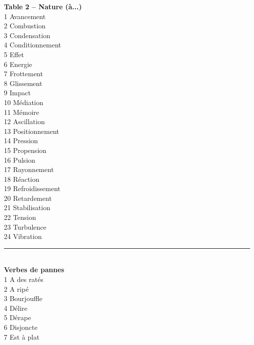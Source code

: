 \documentclass[11pt,twoside,a4paper]{article}
\begin{document}
\begin{table}[ht]
\begin{multicols}{5}
{\textbf{Table 2 -- Nature ({\`a}...)}~\\
1	Avancement~\\
2	Combustion~\\
3	Condensation~\\
4	Conditionnement~\\
5	Effet~\\
6	Energie~\\
7	Frottement~\\
8	Glissement~\\
9	Impact~\\
10	M{\'e}diation~\\
11	M{\'e}moire~\\
12	Ascillation~\\
13	Positionnement~\\
14	Pression~\\
15	Propension~\\
16	Pulsion~\\
17	Rayonnement~\\
18	R{\'e}action~\\
19	Refroidissement~\\
20	Retardement~\\
21	Stabilisation~\\
22	Tension~\\
23	Turbulence~\\
24	Vibration~\\

\rule{0.15\textwidth}{0.05cm}~\\

\textbf{Verbes de pannes}~\\
1	A des rat{\'e}s~\\
2	A rip{\'e}~\\
3	Bourjouffle~\\
4	D{\'e}lire~\\
5	D{\'e}rape~\\
6	Disjoncte~\\
7	Est {\`a} plat~\\

\columnbreak

}
\end{multicols}
\end{table}
\end{document}
